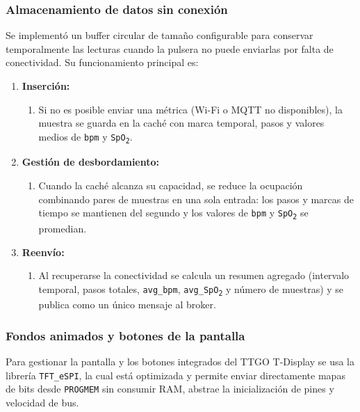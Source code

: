 \documentclass[12pt, a4paper]{article}
\begin{document}
	\subsubsection{Almacenamiento de datos sin conexión}
	Se implementó un buffer circular de tamaño configurable para conservar temporalmente las lecturas cuando la pulsera no puede enviarlas por falta de conectividad. Su funcionamiento principal es:
	
	\begin{enumerate}
		\item \textbf{Inserción:}
		\begin{enumerate}
			\item Si no es posible enviar una métrica (Wi-Fi o MQTT no disponibles), la muestra se guarda en la caché con marca temporal, pasos y valores medios de \texttt{bpm} y \texttt{SpO\textsubscript{2}}.
		\end{enumerate}
		
		\item \textbf{Gestión de desbordamiento:}
		\begin{enumerate}
			\item Cuando la caché alcanza su capacidad, se reduce la ocupación combinando pares de muestras en una sola entrada: los pasos y marcas de tiempo se mantienen del segundo y los valores de \texttt{bpm} y \texttt{SpO\textsubscript{2}} se promedian.
		\end{enumerate}
		
		\item \textbf{Reenvío:}
		\begin{enumerate}
			\item Al recuperarse la conectividad se calcula un resumen agregado (intervalo temporal, pasos totales, \texttt{avg\_bpm}, \texttt{avg\_SpO\textsubscript{2}} y número de muestras) y se publica como un único mensaje al broker.
		\end{enumerate}
	\end{enumerate}
	
	
	\subsubsection{Fondos animados y botones de la pantalla}
	Para gestionar la pantalla y los botones integrados del TTGO T-Display se usa la librería \texttt{TFT\_eSPI}, la cual está optimizada y permite enviar directamente mapas de bits desde \texttt{PROGMEM} sin consumir RAM, abstrae la inicialización de pines y velocidad de bus.
	
\end{document}
